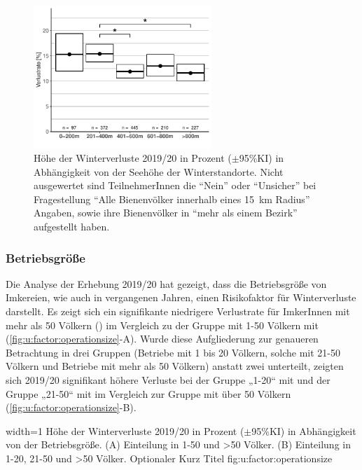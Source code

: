 \begin{figure}[H]
  \centering
  \includegraphics[keepaspectratio,width=0.6\textwidth]{project-U-wintersterblichkeit/figures/plot_elevation}
  \caption{Höhe der Winterverluste 2019/20 in Prozent ($\pm$95\%KI) in Abhängigkeit von der Seehöhe der Winterstandorte. Nicht ausgewertet sind TeilnehmerInnen die \enquote{Nein} oder \enquote{Unsicher} bei Fragestellung \enquote{Alle Bienenvölker innerhalb eines  \SI{15}{\kilo\meter} Radius} Angaben, sowie ihre Bienenvölker in \enquote{mehr als einem Bezirk} aufgestellt haben.}
  \label{fig:u:elevation}
\end{figure}

\subsubsection{Betriebsgröße}
\label{ss:betriebsgroesse:U}

Die Analyse der Erhebung 2019/20 hat gezeigt, dass die Betriebsgröße von Imkereien, wie auch in vergangenen Jahren, einen Risikofaktor für Winterverluste darstellt.
\newline
Es zeigt sich ein signifikante niedrigere Verlustrate für ImkerInnen mit mehr als 50 Völkern () im Vergleich zu der Gruppe mit 1-50 Völkern mit  (\cref{fig:u:factor:operationsize}-A). Wurde diese Aufgliederung zur genaueren Betrachtung in drei Gruppen (Betriebe mit 1 bis 20 Völkern, solche mit 21-50 Völkern und Betriebe mit mehr als 50 Völkern) anstatt zwei unterteilt, zeigten sich 2019/20 signifikant höhere Verluste bei der Gruppe „1-20`` mit  und der Gruppe „21-50`` mit  im Vergleich zur Gruppe mit über 50 Völkern (\cref{fig:u:factor:operationsize}-B).

  {width=1\textwidth} %
  {Höhe der Winterverluste 2019/20 in Prozent ($\pm$95\%KI) in Abhängigkeit von der Betriebsgröße. (A) Einteilung in 1-50 und >50 Völker. (B) Einteilung in 1-20, 21-50 und >50 Völker.} %
  {Optionaler Kurz Titel} %
  {fig:u:factor:operationsize} %

